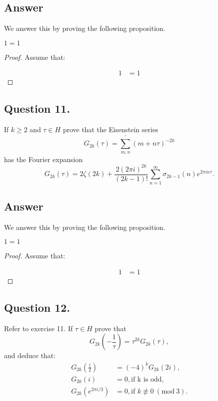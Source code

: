 \subsection*{Answer}
\noindent
We answer this by proving the following proposition.

\begin{proposition}
    $1=1$
\end{proposition}

\begin{proof}
    Assume that:

    \begin{align*}
        1 &= 1
    \end{align*}

\end{proof}


\subsection{Question 11.}
\noindent
If $k \geq 2$ and $\tau \in H$ prove that the Eisenstein series
\[
    G_{2k}(\tau) = \sum_{m,n}^{'}(m + n\tau)^{-2k}
\]
has the Fourier expansion
\[
    G_{2k}(\tau) = 2\zeta(2k) +\frac{2(2 \pi i)^{2k}}{(2k-1)!}\sum_{n=1}^{\infty}\sigma_{2k-1}(n)e^{2\pi i n \tau}.
\]

\subsection*{Answer}
\noindent
We answer this by proving the following proposition.

\begin{proposition}
    $1=1$
\end{proposition}

\begin{proof}
    Assume that:

    \begin{align*}
        1 &= 1
    \end{align*}

\end{proof}


\subsection{Question 12.}
\noindent
Refer to exercise 11. If $\tau \in H$ prove that
\[
    G_{2k}(-\frac{1}{\tau}) = \tau^{2k} G_{2k}(\tau),
\]
and deduce that:
\begin{align*}
    G_{2k}(\frac{i}{2}) &= (-4)^{k}G_{2k}(2i), \\
    G_{2k}(i) &=0 , \text{if k is odd,} \\
    G_{2k}(e^{2\pi i/3}) &=0 , \text{if } k \not\equiv 0\ (\textrm{mod}\ 3).
\end{align*}


